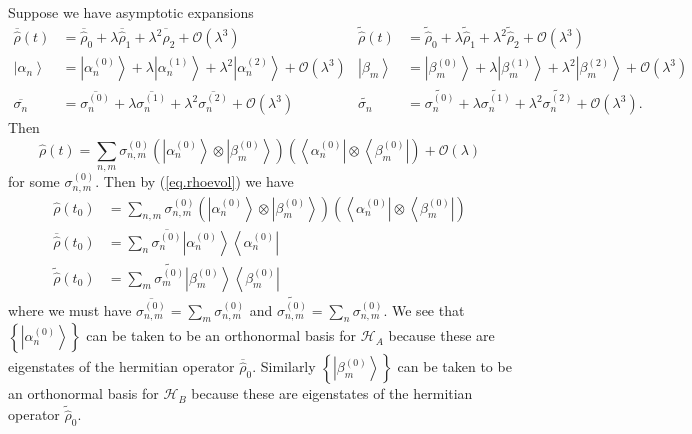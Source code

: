 \documentclass[11pt]{article}
\newcommand{\Od}[1]{\mathcal{O}{\left(#1\right)}}
\newcommand{\bra}[1]{\left\langle#1\right|}
\newcommand{\ket}[1]{\left|#1\right\rangle}
\newcommand{\hilb}{\mathcal{H}}
\newcommand{\op}[1]{\hat{#1}}
\theoremstyle{theorem}
\theoremstyle{remark}
\theoremstyle{step}
\theoremstyle{gap}
\begin{document}
Suppose we have asymptotic expansions
\begin{align*}
\overline{\op{\rho}}(t) &= \overline{\op{\rho}}_0 + \lambda \overline{\op{\rho}}_1 + \lambda^2 \overline{\op{\rho}}_2 + \Od{\lambda^3} &
\widetilde{\op{\rho}}(t) &= \widetilde{\op{\rho}}_0 + \lambda \widetilde{\op{\rho}}_1 + \lambda^2 \widetilde{\op{\rho}}_2 + \Od{\lambda^3} \\
\ket{\alpha_n} &= \ket{\alpha_n^{(0)}} + \lambda \ket{\alpha_n^{(1)}} + \lambda^2 \ket{\alpha_n^{(2)}} + \Od{\lambda^3} &
\ket{\beta_m} &= \ket{\beta_m^{(0)}} + \lambda \ket{\beta_m^{(1)}} + \lambda^2 \ket{\beta_m^{(2)}} + \Od{\lambda^3} \\
\overline{\sigma_n} &= \overline{\sigma_n^{(0)}} + \lambda \overline{\sigma_n^{(1)}} + \lambda^2 \overline{\sigma_n^{(2)}} + \Od{\lambda^3} &
\widetilde{\sigma_n} &= \widetilde{\sigma_n^{(0)}} + \lambda \widetilde{\sigma_n^{(1)}} + \lambda^2 \widetilde{\sigma_n^{(2)}} + \Od{\lambda^3}.
\end{align*}
Then
\[
\op{\rho}(t) = \sum_{n,m} \sigma_{n,m}^{(0)} \left(\ket{\alpha_n^{(0)}}\otimes\ket{\beta_m^{(0)}}\right) \left(\bra{\alpha_n^{(0)}}\otimes\bra{\beta_m^{(0)}}\right) + \Od{\lambda}
\]
for some \(\sigma_{n,m}^{(0)}\). Then by (\ref{eq.rhoevol}) we have
\begin{align}
\label{eq.rho0full}\op{\rho}\left(t_0\right) &= \sum_{n,m} \sigma_{n,m}^{(0)} \left(\ket{\alpha_n^{(0)}}\otimes\ket{\beta_m^{(0)}}\right) \left(\bra{\alpha_n^{(0)}}\otimes\bra{\beta_m^{(0)}}\right) \\
\label{eq.rho0red}\overline{\op{\rho}}\left(t_0\right) &= \sum_{n} \overline{\sigma_{n}^{(0)}}\ket{\alpha_n^{(0)}}\bra{\alpha_n^{(0)}} \\
\widetilde{\op{\rho}}\left(t_0\right) &= \sum_{m} \widetilde{\sigma_{m}^{(0)}}\ket{\beta_m^{(0)}}\bra{\beta_m^{(0)}}
\end{align}
where we must have \(\overline{\sigma_{n,m}^{(0)}} = \sum_m \sigma_{n,m}^{(0)}\) and \(\widetilde{\sigma_{n,m}^{(0)}} = \sum_n \sigma_{n,m}^{(0)}\).
We see that \(\left\{\ket{\alpha_n^{(0)}}\right\}\) can be taken to be an orthonormal basis for \(\hilb_A\) because these are eigenstates of the hermitian operator \(\overline{\op{\rho}}_0\). Similarly \(\left\{\ket{\beta_m^{(0)}}\right\}\) can be taken to be an orthonormal basis for \(\hilb_B\) because these are eigenstates of the hermitian operator \(\widetilde{\op{\rho}}_0\).
\end{document}
